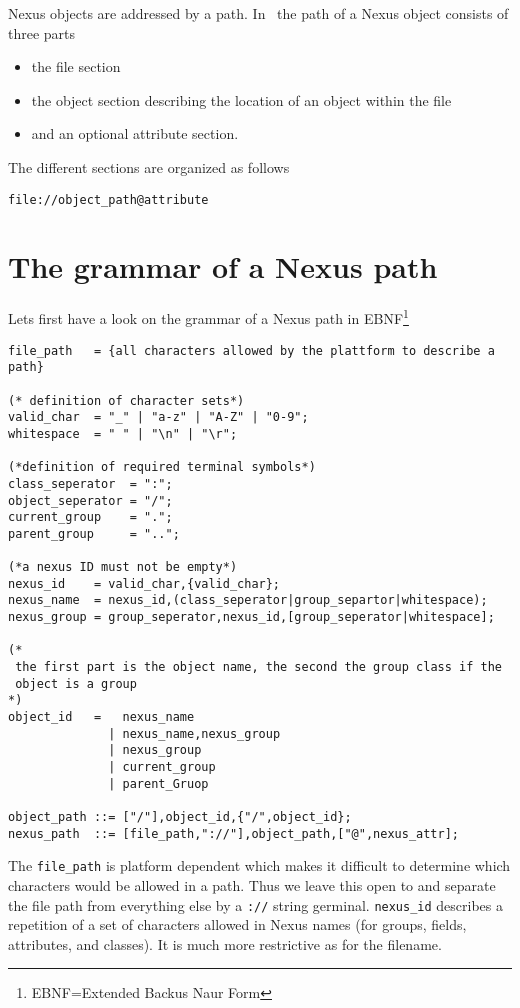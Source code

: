 
Nexus objects are addressed by a path. In \libpniio\ the path of a Nexus object
consists of three parts
\begin{itemize}
\item the file section
\item the object section describing the location of an object within the file
\item and an optional attribute section.
\end{itemize}
The different sections are organized as follows
\begin{verbatim}
file://object_path@attribute
\end{verbatim}

\section{The grammar of a Nexus path}
Lets first have a look on the grammar of a Nexus path in
EBNF\footnote{EBNF=Extended Backus Naur Form}
\begin{verbatim}
file_path   = {all characters allowed by the plattform to describe a path}

(* definition of character sets*)
valid_char  = "_" | "a-z" | "A-Z" | "0-9";
whitespace  = " " | "\n" | "\r";

(*definition of required terminal symbols*)
class_seperator  = ":";
object_seperator = "/";
current_group    = ".";
parent_group     = "..";

(*a nexus ID must not be empty*)
nexus_id    = valid_char,{valid_char}; 
nexus_name  = nexus_id,(class_seperator|group_separtor|whitespace);
nexus_group = group_seperator,nexus_id,[group_seperator|whitespace];

(*
 the first part is the object name, the second the group class if the 
 object is a group
*)
object_id   =   nexus_name    
              | nexus_name,nexus_group 
              | nexus_group   
              | current_group 
              | parent_Gruop  
                                             
object_path ::= ["/"],object_id,{"/",object_id};
nexus_path  ::= [file_path,"://"],object_path,["@",nexus_attr];
\end{verbatim}

The {\tt file\_path} is platform dependent which makes it difficult to determine
which characters would be allowed in a path. Thus we leave this open to and
separate the file path from everything else by a {\tt ://} string germinal.
{\tt nexus\_id} describes a repetition of a set of characters allowed in Nexus
names (for groups, fields, attributes, and classes). It is much more restrictive
as for the filename.
